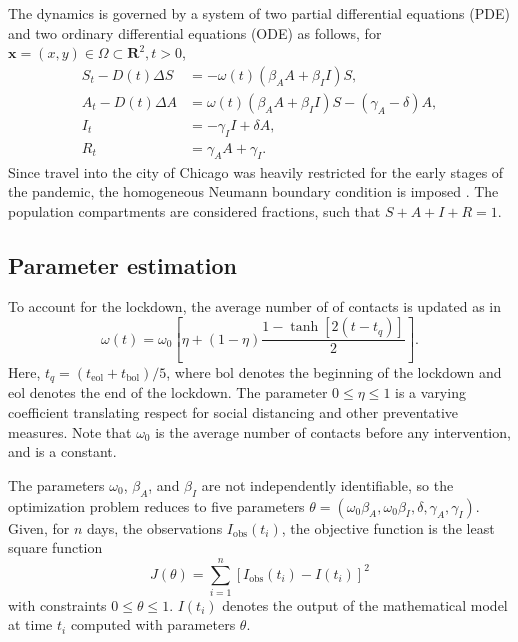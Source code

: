 \documentclass[11pt]{article}
\newcommand{\R}{\mathbf{R}}
\renewcommand\vec{\mathbf}
\begin{document}
		The dynamics is governed by a system of two partial differential equations (PDE) and two ordinary differential equations (ODE) as follows, for $\vec{x} = (x,y) \in \Omega \subset \R^2, t > 0$,
		\begin{equation} \label{eq:model}
			\begin{aligned}
				S_t - D(t) \Delta S &= - \omega(t) \left( \beta_A A + \beta_I I \right) S, \\
				A_t - D(t) \Delta A &= \omega(t) \left( \beta_A A + \beta_I I \right) S - (\gamma_A - \delta) A, \\
				I_t &= - \gamma_I I + \delta A, \\
				R_t &= \gamma_A A + \gamma_I.
			\end{aligned}
		\end{equation}
		Since travel into the city of Chicago was heavily restricted for the early stages of the pandemic, the homogeneous Neumann boundary condition is imposed \cite{Mammeri+2020+102+113}.
		The population compartments are considered fractions, such that $S + A + I + R = 1$.
	
	\subsection{Parameter estimation}
		To account for the lockdown, the average number of of contacts is updated as in  \cite{Kevrekidis-2021}
		\begin{equation} \label{eq:contacts}
			\omega (t) = \omega_0 \left[ \eta + (1 - \eta) \frac{1 - \tanh \left[2 (t - t_q) \right]}{2} \right].
		\end{equation}
		Here, $t_q = (t_{\mathrm{eol}} + t_{\mathrm{bol}}) / 5$, where $\mathrm{bol}$ denotes the beginning of the lockdown and $\mathrm{eol}$ denotes the end of the lockdown.
		The parameter $0 \leq \eta \leq 1$ is a varying coefficient translating respect for social distancing and other preventative measures.
		Note that $\omega_0$ is the average number of contacts before any intervention, and is a constant.
		
		The parameters $\omega_0$, $\beta_A$, and $\beta_I$ are not independently identifiable, so the optimization problem reduces to five parameters $\theta = (\omega_0 \beta_A, \omega_0 \beta_I, \delta, \gamma_A, \gamma_I)$.
		Given, for $n$ days, the observations $I_\mathrm{obs} (t_i)$, the objective function is the least square function
		\begin{equation} \label{eq:obj}
			J (\theta) = \sum_{i=1}^n \left[ I_\mathrm{obs} (t_i) - I (t_i) \right]^2
		\end{equation}
		with constraints $0 \leq \theta \leq 1$.
		$I (t_i)$ denotes the output of the mathematical model at time $t_i$ computed with parameters $\theta$.
		
\end{document}
